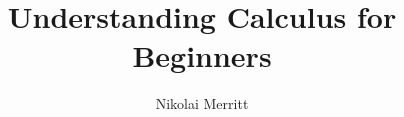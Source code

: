\documentclass[11pt, leqno]{article}
\author{Nikolai Merritt}
\title{Understanding Calculus for Beginners}
\date{\vspace{-5ex}}
\numberwithin{equation}{section}
\begin{document}
	
\newcommand{\Diff}[1] {\mathop{\text{d}#1}}
\newcommand{\Deriv}[2] {\frac{ \Diff{#1} }{ \Diff{#2} }}
\newcommand{\DelFrac}[2]{\frac{\Delta #1}{\Delta #2}}
\newcommand{\LimDeriv}[2]{ \lim_{\Delta #2 \to 0} \frac{#1(#2 + \Delta #2) - #1(#2)}{\Delta #2} }
\newcommand{\NthDeriv}[3]{\frac{ \text{d}^{#3} #1} {\text{d} #2^{#3}}}
\newcommand{\OutsideDeriv}[2]{\frac{ \text{d} }{ \text{d} #2 } \left( #1 \right)}
\newcommand{\asreq}{\textrm{, as required.} \qed}
\newcommand{\fs}{\, .}
\newcommand{\nn}{\\ \nonumber \\}
\maketitle

\newpage
\tableofcontents

\newpage
\end{document}
